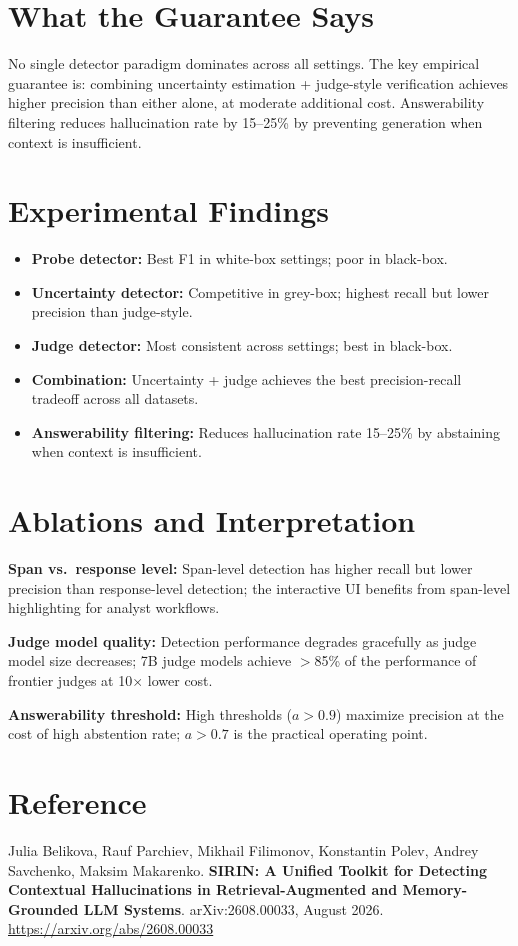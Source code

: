 \documentclass[10pt,twocolumn]{article}
\begin{document}
\section{What the Guarantee Says}

No single detector paradigm dominates across all settings. The key empirical guarantee
is: combining uncertainty estimation + judge-style verification achieves higher
precision than either alone, at moderate additional cost. Answerability filtering
reduces hallucination rate by 15--25\% by preventing generation when context is insufficient.

\section{Experimental Findings}

\begin{itemize}[itemsep=2pt,parsep=0pt]
  \item \textbf{Probe detector:} Best F1 in white-box settings; poor in black-box.
  \item \textbf{Uncertainty detector:} Competitive in grey-box; highest recall but
    lower precision than judge-style.
  \item \textbf{Judge detector:} Most consistent across settings; best in black-box.
  \item \textbf{Combination:} Uncertainty + judge achieves the best precision-recall
    tradeoff across all datasets.
  \item \textbf{Answerability filtering:} Reduces hallucination rate 15--25\%
    by abstaining when context is insufficient.
\end{itemize}

\section{Ablations and Interpretation}

\textbf{Span vs.\ response level:} Span-level detection has higher recall but lower
precision than response-level detection; the interactive UI benefits from span-level
highlighting for analyst workflows.

\textbf{Judge model quality:} Detection performance degrades gracefully as judge
model size decreases; 7B judge models achieve $>$85\% of the performance of
frontier judges at 10$\times$ lower cost.

\textbf{Answerability threshold:} High thresholds ($a > 0.9$) maximize precision
at the cost of high abstention rate; $a > 0.7$ is the practical operating point.

\section*{Reference}

Julia Belikova, Rauf Parchiev, Mikhail Filimonov, Konstantin Polev,
Andrey Savchenko, Maksim Makarenko.
\textbf{SIRIN: A Unified Toolkit for Detecting Contextual Hallucinations
in Retrieval-Augmented and Memory-Grounded LLM Systems}.
arXiv:2608.00033, August 2026.
\url{https://arxiv.org/abs/2608.00033}
\end{document}

